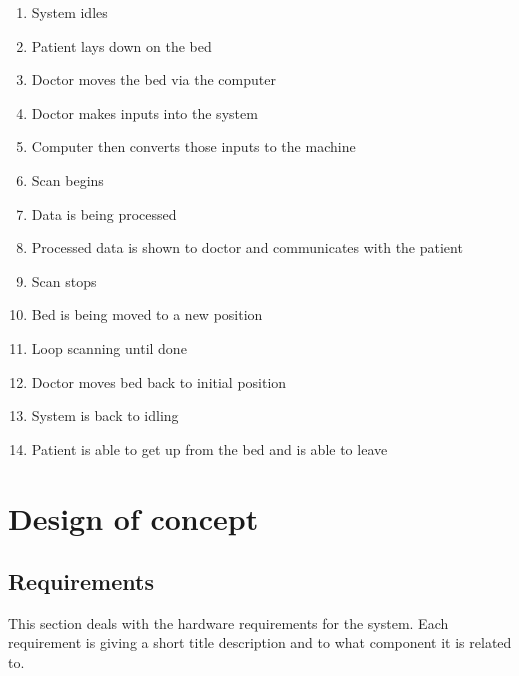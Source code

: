 \documentclass[conference]{IEEEtran}
\begin{document}
    \begin{enumerate}
        \item System idles
        \item Patient lays down on the bed
        \item Doctor moves the bed via the computer
        \item Doctor makes inputs into the system
        \item Computer then converts those inputs to the machine
        \item Scan begins
        \item Data is being processed
        \item Processed data is shown to doctor and communicates with the patient
        \item Scan stops
        \item Bed is being moved to a new position
        \item Loop scanning until done
        \item Doctor moves bed back to initial position
        \item System is back to idling
        \item Patient is able to get up from the bed and is able to leave
    \end{enumerate}
    

\section{Design of concept}

    \subsection{Requirements}
    
    This section deals with the hardware requirements for the system. Each requirement is giving a short title description and to what component it is related to.
    
\end{document}
